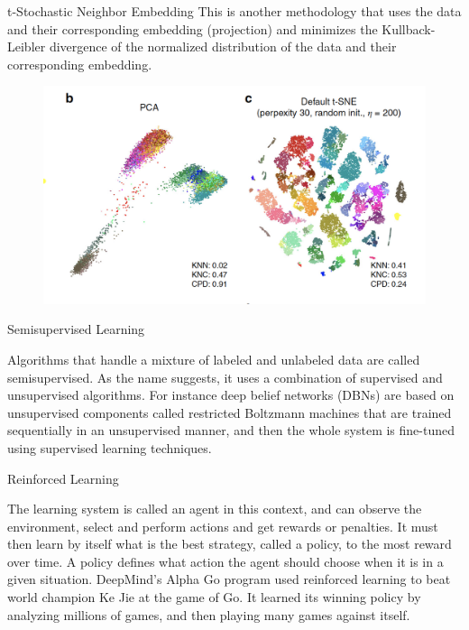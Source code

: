 \documentclass[11pt, aspectratio=43]{beamer}
\begin{document}
\begin{frame}{t-Stochastic Neighbor Embedding}
	This is another methodology that uses the data and their corresponding embedding (projection) and minimizes the Kullback-Leibler divergence of the normalized distribution of the data and their corresponding embedding. 
		\begin{figure}[h]
	\centering
	\includegraphics[scale=0.4]{Figures/pca_vs_tsne.png}
\end{figure}	
	
\end{frame}



\begin{frame}{Semisupervised Learning}	

	Algorithms that handle a mixture of labeled and unlabeled data are called semisupervised. As the name suggests, it uses a combination of supervised and unsupervised algorithms. For instance deep belief networks (DBNs) are based on unsupervised components called restricted Boltzmann machines that are trained sequentially in an unsupervised manner, and then the whole system is fine-tuned using supervised learning techniques.

\end{frame}

\begin{frame}{Reinforced Learning}	
	
	The learning system is called an agent in this context, and can observe the environment, select and perform actions and get rewards or penalties. It must then learn by itself what is the best strategy, called a policy, to the most reward over time. A policy defines what action the agent should choose when it is in a given situation. DeepMind's Alpha Go program used reinforced learning to beat world champion Ke Jie at the game of Go. It learned its winning policy by analyzing millions of games, and then playing many games against itself.
\end{frame}
\end{document}
